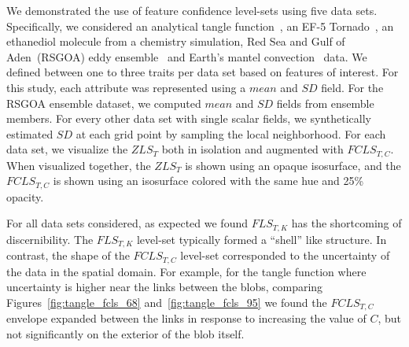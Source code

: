 %



%
We demonstrated the use of feature confidence level-sets using five data sets.
%
Specifically, we considered an analytical tangle function~\cite{knoll2009fast}, an EF-5 Tornado~\cite{atmos10100578}, an ethanediol molecule from a chemistry simulation, Red Sea and Gulf of Aden~(RSGOA) eddy ensemble~\cite{sanikommu2020impact} and Earth's mantel convection~\cite{shahnas2017mid} data.
%
We defined between one to three traits per data set based on features of interest. 
%
%
For this study, each attribute was represented using a $mean$ and $SD$ field. 
%
For the RSGOA ensemble dataset, we computed $mean$ and $SD$ fields from ensemble members. 
%
For every other data set with single scalar fields, we synthetically estimated $SD$ at each grid point by sampling the local neighborhood.
%
For each data set, we visualize the $ZLS_{T}$ both in isolation and augmented with $FCLS_{T,C}$. 
%
When visualized together, the $ZLS_{T}$ is shown using an opaque isosurface, and the $FCLS_{T,C}$ is shown using an isosurface colored with the same hue and 25\% opacity.

%

For all data sets considered, as expected we found $FLS_{T,K}$ has the shortcoming of discernibility.
%
The $FLS_{T,K}$ level-set typically formed a ``shell'' like structure.
%
In contrast, the shape of the $FCLS_{T,C}$ level-set corresponded to the uncertainty of the data in the spatial domain.
%
For example, for the tangle function where uncertainty is higher near the links between the blobs, comparing Figures~\ref{fig:tangle_fcls_68} and~\ref{fig:tangle_fcls_95} we found the $FCLS_{T,C}$ envelope expanded between the links in response to increasing the value of $C$, but not significantly on the exterior of the blob itself.

